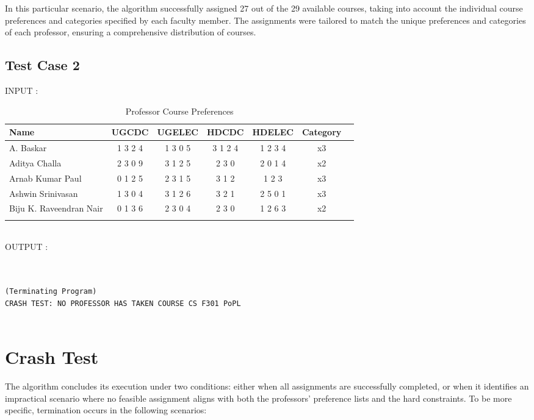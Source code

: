 \documentclass{article}
\begin{document}
In this particular scenario, the algorithm successfully assigned 27 out of the 29 available courses, taking into account the individual course preferences and categories specified by each faculty member. The assignments were tailored to match the unique preferences and categories of each professor, ensuring a comprehensive distribution of courses.


\subsection{Test Case 2}

INPUT : 
\begin{table}[h]
  \centering
  \caption{Professor Course Preferences}
  \begin{tabular}{lcccccc}
    \toprule
    Name & UGCDC & UGELEC & HDCDC & HDELEC & Category \\
    \midrule
        A. Baskar & 1 3 2 4 & 1 3 0 5 & 3 1 2 4 & 1 2 3 4 & x3 \\
    Aditya Challa & 2 3 0 9 & 3 1 2 5 & 2 3 0 & 2 0 1 4 & x2 \\
    Arnab Kumar Paul & 0 1 2 5 & 2 3 1 5 & 3 1 2 & 1 2 3 & x3 \\
    Ashwin Srinivasan & 1 3 0 4 & 3 1 2 6 & 3 2 1 & 2 5 0 1 & x3 \\
    Biju K. Raveendran Nair & 0 1 3 6 & 2 3 0 4 & 2 3 0 & 1 2 6 3 & x2 \\
    \\
    \bottomrule
  \end{tabular}
  \label{tab:prof_preferences}
\end{table}
  \\
OUTPUT : 
\\
\begin{lstlisting}[basicstyle=\ttfamily\footnotesize, breaklines=true]


(Terminating Program)
CRASH TEST: NO PROFESSOR HAS TAKEN COURSE CS F301 PoPL


\end{lstlisting}
\section{Crash Test}

The algorithm concludes its execution under two conditions: either when all assignments are successfully completed, or when it identifies an impractical scenario where no feasible assignment aligns with both the professors' preference lists and the hard constraints. To be more specific, termination occurs in the following scenarios:
\end{document}
